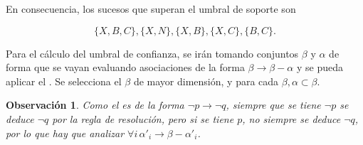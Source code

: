 \documentclass[12pt]{report}\usepackage[]{graphicx}\usepackage[dvipsnames]{xcolor}
\newtheorem{observation}{Observación}[section]
\begin{document}
			En consecuencia, los sucesos que superan el umbral de soporte son 
			
			$$
			\{X, B, C\}, \{X, N\}, \{X, B\}, \{X, C\}, \{B, C\}. 
			$$
			
			Para el cálculo del umbral de confianza, se irán tomando conjuntos $\beta$ y $\alpha$ de forma que se vayan evaluando asociaciones de la forma $\beta \rightarrow \beta - \alpha$ y se pueda aplicar el . Se selecciona el $\beta$ de mayor dimensión, y para cada $\beta, \alpha \subset \beta$. 
			
			\begin{observation}
				Como el  es de la forma $\lnot p \rightarrow \lnot q$, siempre que se tiene $\lnot p$ se deduce $\lnot q$ por la regla de resolución, pero si se tiene $p$, no siempre se deduce $\lnot q$, por lo que hay que analizar $\forall i \, \alpha'_i \rightarrow \beta - \alpha'_i$.
				\label{obs:ap}
			\end{observation}
			
\end{document}
